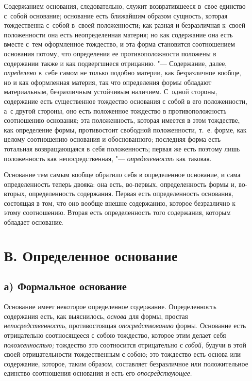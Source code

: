 Содержанием основания, следовательно, служит возвратившееся в~свое единство
с~собой основание; основание есть ближайшим образом сущность, которая
тождественна с~собой в~своей положенности; как разная и безразличная к~своей
положенности она есть неопределенная материя; но как содержание она есть вместе
с~тем оформленное тождество, и эта форма становится соотношением основания
потому, что определения ее противоположности положены в содержании также и как
подвергшиеся отрицанию. "--- Содержание, далее, {\em определено} в~себе самом
не только подобно материи, как безразличное вообще, но и как оформленная
материя, так что определения формы обладают материальным, безразличным
устойчивым наличием. С~одной стороны, содержание есть существенное тождество
основания с собой в его положенности, а~с другой стороны, оно есть положенное
тождество в противоположность соотношению основания; эта положенность, которая
имеется в этом тождестве, как определение формы, противостоит свободной
положенности, т.~е. форме, как целому соотношению основания и обоснованного;
последняя форма есть тотальная возвращающаяся в себя положенность; первая же
есть поэтому лишь положенность как непосредственная, "--- {\em определенность}
как таковая.

Основание тем самым вообще обратило себя в определенное основание, и сама
определенность теперь двояка: она есть, во-первых, определенность формы и,
во-вторых, определенность содержания. Первая есть определенность основания,
состоящая в том, что оно вообще внешне содержанию, которое безразлично к
этому соотношению. Вторая есть определенность того содержания, которым
обладает основание.


\section[В. Определенное основание]{В. Определенное основание}

\subsection[а) Формальное основание]{а) Формальное основание}

Основание имеет некоторое определенное содержание. Определенность содержания
есть, как выяснилось, {\em основа} для формы, простая {\em непосредственность},
противостоящая {\em опосредствованию} формы. Основание есть отрицательно
соотносящееся с собою тождество, которое этим делает себя {\em положенностью;}
тождество это соотносится отрицательно с {\em собой}, будучи в этой своей
отрицательности тождественным с собою; это тождество есть основа или
содержание, которое, таким образом, составляет безразличное или положительное
единство соотношения основания и есть его {\em опосредствующее}.

